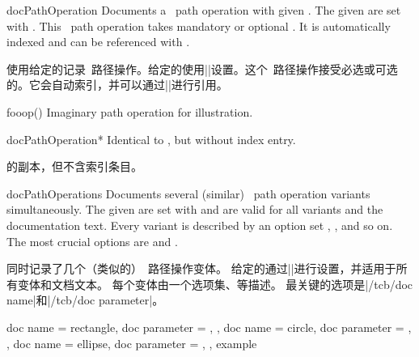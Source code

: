 \begin{docEnvironment}[doclang/environment content=operation description,
  doc new and updated={2019-09-18}{2020-04-22}]{docPathOperation}{}
Documents a \tikzname\ path operation with given .
The given  are set with .
This \tikzname\ path operation takes mandatory or optional .
It is automatically indexed and can be referenced with
.

使用给定的记录\tikzname\ 路径操作。给定的使用|\tcbset|设置。这个\tikzname\ 路径操作接受必选或可选的。它会自动索引，并可以通过||进行引用。
\begin{dispExample}
\begin{docPathOperation}{fooop}{()}
Imaginary path operation for illustration.
\end{docPathOperation}
\end{dispExample}
\end{docEnvironment}


\begin{docEnvironment}[doclang/environment content=command description,
  doc new and updated={2019-09-18}{2020-04-22}]{docPathOperation*}{}
Identical to , but without index entry.

 的副本，但不含索引条目。
\end{docEnvironment}


\begin{docEnvironment}[doclang/environment content=command description,
  doc new={2020-04-22}]{docPathOperations}{}
Documents several (similar) \tikzname\ path operation variants simultaneously.
The given  are set with  and are valid for
all variants and the documentation text.
Every variant is described by an option set , , and so on.
The most crucial options are  and .

同时记录了几个（类似的）\tikzname\ 路径操作变体。 给定的通过|\tcbset|进行设置，并适用于所有变体和文档文本。 每个变体由一个选项集、等描述。 最关键的选项是|/tcb/doc name|和|/tcb/doc parameter|。

\begin{dispExample}
\begin{docPathOperations}
{
  {
    doc name      = rectangle,
    doc parameter = ,
  },
  {
    doc name      = circle,
    doc parameter = ,
  },
  {
    doc name      = ellipse,
    doc parameter = ,
  },
}
example
\end{docPathOperations}
\end{dispExample}
\end{docEnvironment}
